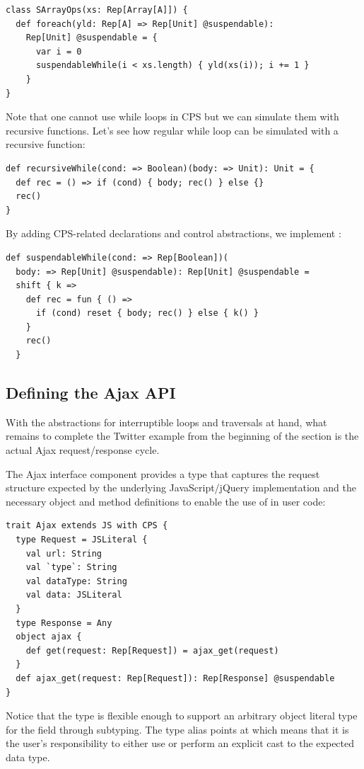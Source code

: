 \documentclass[runningheads,a4paper]{llncs}
\begin{document}
\begin{lstlisting}[caption=Suspendable foreach,label=code:suspendable_foreach]
class SArrayOps(xs: Rep[Array[A]]) {
  def foreach(yld: Rep[A] => Rep[Unit] @suspendable):
    Rep[Unit] @suspendable = {
      var i = 0
      suspendableWhile(i < xs.length) { yld(xs(i)); i += 1 }
    }
}
\end{lstlisting}
Note that one cannot use while loops in CPS but we can simulate them with recursive functions. Let's see how regular while loop can be simulated with a recursive function:
\begin{lstlisting}
def recursiveWhile(cond: => Boolean)(body: => Unit): Unit = {
  def rec = () => if (cond) { body; rec() } else {}
  rec()
}
\end{lstlisting}

By adding CPS-related declarations and control abstractions, we implement :

\begin{lstlisting}
def suspendableWhile(cond: => Rep[Boolean])(
  body: => Rep[Unit] @suspendable): Rep[Unit] @suspendable =
  shift { k =>
    def rec = fun { () =>
      if (cond) reset { body; rec() } else { k() }
    }
    rec()
  }
\end{lstlisting}

\subsection{Defining the Ajax API}

With the abstractions for interruptible loops and traversals at hand,
what remains to complete the Twitter example from the beginning of the section
is the actual Ajax request/response cycle.

The Ajax interface component provides a type  that captures the 
request structure expected by the underlying JavaScript/jQuery implementation and the
necessary object and method definitions to enable the use of  in user
code:
\begin{lstlisting}
trait Ajax extends JS with CPS {
  type Request = JSLiteral {
    val url: String
    val `type`: String
    val dataType: String
    val data: JSLiteral
  }
  type Response = Any
  object ajax {
    def get(request: Rep[Request]) = ajax_get(request)
  }
  def ajax_get(request: Rep[Request]): Rep[Response] @suspendable
}
\end{lstlisting}

Notice that the  type is flexible enough to support an arbitrary object literal type for the  field through subtyping. The  type alias points at  which means that it is the user's responsibility to either use  or perform an explicit cast to the expected data type.
\end{document}
